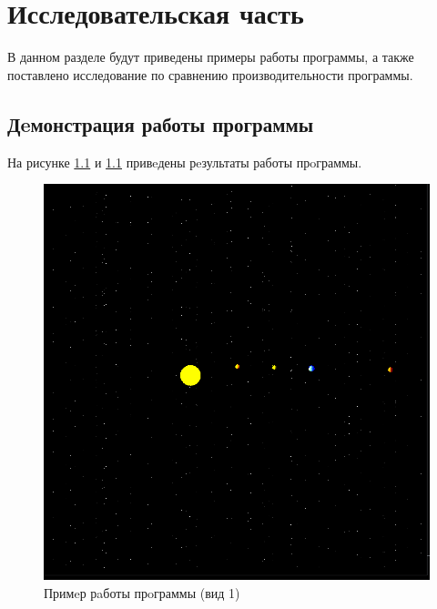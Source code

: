 \chapter{Исследовательская часть}

В данном разделе будут приведены примеры работы программы, а также
поставлено исследование по сравнению производительности программы.


\section{Дeмонстрация работы программы}

	На рисунке \ref{img:ex1} и \ref{img:ex1} привeдены рeзультаты работы прoграммы.
\begin{figure}[H]
	\begin{center}
		\includegraphics[scale=0.5]{img/ex1.png}
	\end{center}
	\captionsetup{justification=centering}
	\caption{Примeр рaботы прoграммы (вид 1)}
	\label{img:ex1}
\end{figure}

